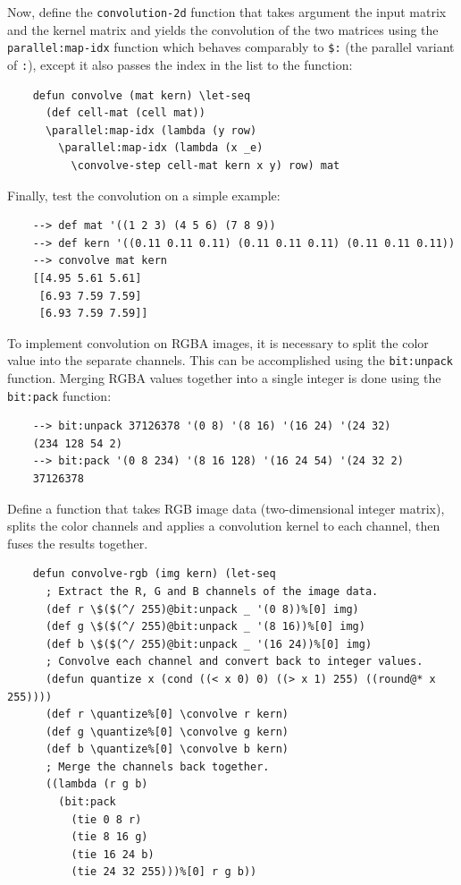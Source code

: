 Now, define the \verb|convolution-2d| function that takes argument the input matrix and the kernel matrix and yields the convolution of the two matrices using the \verb|parallel:map-idx| function which behaves comparably to \verb|$:| (the parallel variant of \verb|:|), except it also passes the index in the list to the function:

\begin{Verbatim}
    defun convolve (mat kern) \let-seq
      (def cell-mat (cell mat))
      \parallel:map-idx (lambda (y row)
        \parallel:map-idx (lambda (x _e)
          \convolve-step cell-mat kern x y) row) mat
\end{Verbatim}

Finally, test the convolution on a simple example:

\begin{Verbatim}
    --> def mat '((1 2 3) (4 5 6) (7 8 9))
    --> def kern '((0.11 0.11 0.11) (0.11 0.11 0.11) (0.11 0.11 0.11))
    --> convolve mat kern
    [[4.95 5.61 5.61]
     [6.93 7.59 7.59]
     [6.93 7.59 7.59]]
\end{Verbatim}

To implement convolution on RGBA images, it is necessary to split the color value into the separate channels. This can be accomplished using the \verb|bit:unpack| function. Merging RGBA values together into a single integer is done using the \verb|bit:pack| function:

\begin{Verbatim}
    --> bit:unpack 37126378 '(0 8) '(8 16) '(16 24) '(24 32)
    (234 128 54 2)
    --> bit:pack '(0 8 234) '(8 16 128) '(16 24 54) '(24 32 2)
    37126378
\end{Verbatim}

Define a function that takes RGB image data (two-dimensional integer matrix), splits the color channels and applies a convolution kernel to each channel, then fuses the results together.

\begin{Verbatim}
    defun convolve-rgb (img kern) (let-seq
      ; Extract the R, G and B channels of the image data.
      (def r \$($(^/ 255)@bit:unpack _ '(0 8))%[0] img)
      (def g \$($(^/ 255)@bit:unpack _ '(8 16))%[0] img)
      (def b \$($(^/ 255)@bit:unpack _ '(16 24))%[0] img)
      ; Convolve each channel and convert back to integer values.
      (defun quantize x (cond ((< x 0) 0) ((> x 1) 255) ((round@* x 255))))
      (def r \quantize%[0] \convolve r kern)
      (def g \quantize%[0] \convolve g kern)
      (def b \quantize%[0] \convolve b kern)
      ; Merge the channels back together.
      ((lambda (r g b)
        (bit:pack
          (tie 0 8 r)
          (tie 8 16 g)
          (tie 16 24 b)
          (tie 24 32 255)))%[0] r g b))
\end{Verbatim}


